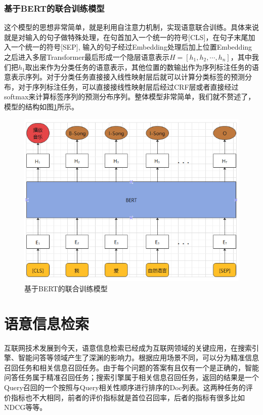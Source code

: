 \documentclass[twoside,a4paper,12pt]{book}%
\begin{document}
\subsection{基于BERT的联合训练模型}
这个模型的思想非常简单，就是利用自注意力机制，实现语意联合训练。具体来说就是对输入的句子做特殊处理，在句首加入一个统一的符号[CLS]，在句子末尾加入一个统一的符号[SEP], 输入的句子经过Embedding处理后加上位置Embedding之后进入多层Transformer最后形成一个隐层语意表示$H=[h_1,h_2,\cdots,h_n]$，其中我们把$h_1$取出来作为分类任务的语意表示，其他位置的数输出作为序列标注任务的语意表示序列。对于分类任务直接接入线性映射层后就可以计算分类标签的预测分布，对于序列标注任务，可以直接接线性映射层后经过\gls{CRF}层或者直接经过softmax来计算标签序列的预测分布序列。整体模型非常简单，我们就不赘述了，模型的结构如图\ref{fig:sl-bert1}所示。
\begin{figure}[htbp]
\begin{center}
\includegraphics[width=5.2in]{figures/sl-bert1.png}
\caption{基于BERT的联合训练模型} \label{fig:sl-bert1}
\end{center}
\end{figure}

\chapter{语意信息检索}
互联网技术发展到今天，语意信息检索已经成为互联网领域的关键应用，在搜索引擎、智能问答等领域产生了深渊的影响力。根据应用场景不同，可以分为精准信息召回任务和相关信息召回任务。由于每个问题的答案有且仅有一个是正确的，智能问答任务属于精准召回任务；搜索引擎属于相关信息召回任务，返回的结果是一个Query召回的一个按照与Query相关性顺序进行排序的Doc列表。这两种任务的评价指标也不大相同，前者的评价指标就是首位召回率，后者的指标有很多比如NDCG等等。
\end{document}
